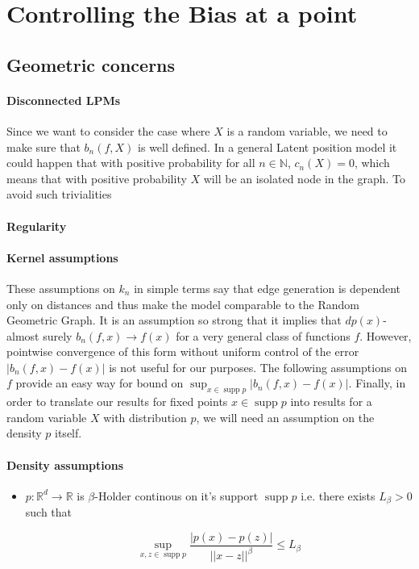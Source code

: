 \documentclass{article}
\DeclareMathOperator\supp{supp}
\begin{document}
\section{Controlling the Bias at a point}
\subsection{Geometric concerns}

\paragraph{Disconnected LPMs}

Since we want to consider the case where $X$ is a random variable, we need to make sure that $b_n(f,X)$ is well defined. In a general Latent position model it could happen that with positive probability for all $n\in\mathbb{N}$, $c_n(X)=0$, which means that with positive probability $X$ will be an isolated node in the graph. To avoid such trivialities 

\paragraph{Regularity}



\paragraph{Kernel assumptions}
These assumptions on $k_n$ in simple terms say that edge generation is dependent only on distances and thus make the model comparable to the Random Geometric Graph. It is an assumption so strong that it implies that  $dp(x)$-almost surely  $b_n(f,x)\rightarrow f(x)$ for a very general class of functions $f$. However, pointwise convergence of this form without uniform control of the error $|b_n(f,x)-f(x)|$ is not useful for our purposes. The following assumptions on $f$  
provide an easy way for bound on $\sup_{x\in\supp{p}}|b_n(f,x)-f(x)|$.
Finally, in order to translate our results for fixed points $x\in\supp{p}$ into results for a random variable $X$ with distribution $p$, we will need an assumption on the density $p$ itself.

\paragraph{Density assumptions}
\begin{itemize}
    \item $p\colon\mathbb{R}^d\to\mathbb{R}$ is $\beta$-Holder continous on it's support $\supp{p}$ i.e.
    there exists $L_{\beta}>0$ such that 
    
    \begin{equation*}
        \sup_{x,z\in\supp{p}} \frac{|p(x)-p(z)|}{||x-z||^{\beta}}\leq L_{\beta}  
    \end{equation*}
    
    
\end{itemize}
\end{document}
